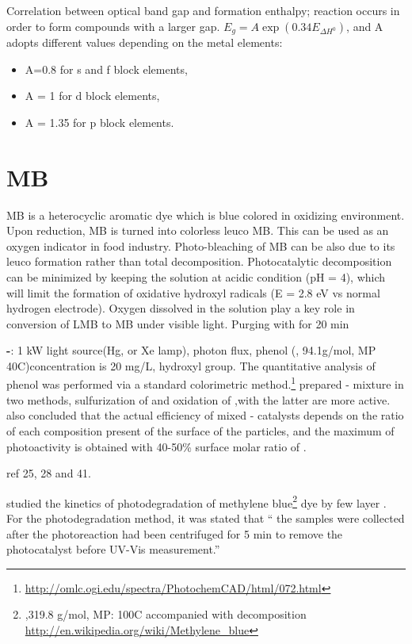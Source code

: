 Correlation between optical band gap and formation enthalpy; reaction occurs in order to form compounds with a larger gap.  $E_g = A \exp(0.34E_{\Delta H^0})$, and A adopts different values depending on the metal elements:
\begin{itemize}
\item A=0.8 for s and f block elements,
\item A = 1 for d block elements,
\item A = 1.35 for p block elements.
\end{itemize}

\section{MB}

MB is a heterocyclic aromatic dye which is blue colored in oxidizing environment. Upon reduction, MB is turned into colorless leuco MB. This can be used as an oxygen indicator in food industry. Photo-bleaching of MB can be also due to its leuco formation rather than total decomposition. Photocatalytic decomposition can be minimized by keeping the solution at acidic condition (pH = 4), which will limit the formation of oxidative hydroxyl radicals (E = 2.8 eV vs normal hydrogen electrode). Oxygen dissolved in the solution play a key role in conversion of LMB to MB under visible light. Purging with  for 20 min


\textbf{-}: 1 kW light source(Hg, or Xe lamp), photon flux, phenol (, 94.1g/mol, MP 40C)concentration is 20 mg/L, hydroxyl group. The quantitative analysis of phenol was performed via a standard colorimetric method.\footnote{\url{http://omlc.ogi.edu/spectra/PhotochemCAD/html/072.html}}
\citeauthor{DiPaola1999} prepared - mixture in two methods, sulfurization of  and oxidation of ,with the latter are more active.
\citeauthor{DiPaola1999} also concluded that the actual efficiency of mixed - catalysts depends on the ratio of each composition present of the surface of the particles, and the maximum of photoactivity is obtained with 40-50\% surface molar ratio of .

ref 25, 28 and 41.

\citeauthor{Sreedhara2013} studied the kinetics of photodegradation of methylene blue\footnote{,319.8 g/mol, MP: 100C accompanied with decomposition \url{http://en.wikipedia.org/wiki/Methylene_blue}} dye by few layer .
For the photodegradation method, it was stated that `` the samples were collected after the photoreaction had been centrifuged for 5 min to remove the photocatalyst before UV-Vis measurement.''


